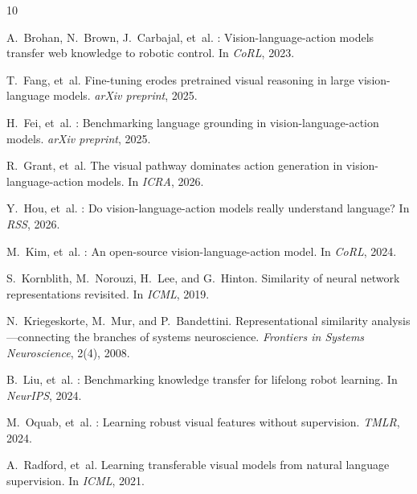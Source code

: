 \documentclass[letterpaper]{article}
\begin{document}
\begin{thebibliography}{10}

A.~Brohan, N.~Brown, J.~Carbajal, et~al.
: Vision-language-action models transfer web knowledge to robotic control.
\newblock In \emph{CoRL}, 2023.

T.~Fang, et~al.
\newblock Fine-tuning erodes pretrained visual reasoning in large vision-language models.
\newblock \emph{arXiv preprint}, 2025.

H.~Fei, et~al.
: Benchmarking language grounding in vision-language-action models.
\newblock \emph{arXiv preprint}, 2025.

R.~Grant, et~al.
\newblock The visual pathway dominates action generation in vision-language-action models.
\newblock In \emph{ICRA}, 2026.

Y.~Hou, et~al.
: Do vision-language-action models really understand language?
\newblock In \emph{RSS}, 2026.

M.~Kim, et~al.
: An open-source vision-language-action model.
\newblock In \emph{CoRL}, 2024.

S.~Kornblith, M.~Norouzi, H.~Lee, and G.~Hinton.
\newblock Similarity of neural network representations revisited.
\newblock In \emph{ICML}, 2019.

N.~Kriegeskorte, M.~Mur, and P.~Bandettini.
\newblock Representational similarity analysis---connecting the branches of systems neuroscience.
\newblock \emph{Frontiers in Systems Neuroscience}, 2(4), 2008.

B.~Liu, et~al.
: Benchmarking knowledge transfer for lifelong robot learning.
\newblock In \emph{NeurIPS}, 2024.

M.~Oquab, et~al.
: Learning robust visual features without supervision.
\newblock \emph{TMLR}, 2024.

A.~Radford, et~al.
\newblock Learning transferable visual models from natural language supervision.
\newblock In \emph{ICML}, 2021.

\end{thebibliography}
\end{document}
